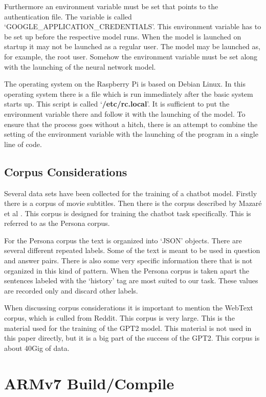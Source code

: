 Furthermore an environment variable must be set that points to the authentication file. The variable is called `GOOGLE\_APPLICATION\_CREDENTIALS'. This environment variable has to be set up before the respective model runs. When the model is launched on startup it may not be launched as a regular user. The model may be launched as, for example, the root user. Somehow the environment variable must be set along with the launching of the neural network model.

The operating system on the Raspberry Pi is based on Debian Linux. In this operating system there is a file which is run immediately after the basic system starts up. This script is called `\textbf{/etc/rc.local}'. It is sufficient to put the environment variable there and follow it with the launching of the model. To ensure that the process goes without a hitch, there is an attempt to combine the setting of the environment variable with the launching of the program in a single line of code.


\subsection{Corpus Considerations}

Several data sets have been collected for the training of a chatbot model. Firstly there is a corpus of movie subtitles. Then there is the corpus described by Mazar{\'{e}} et al \cite{DBLP:journals/corr/abs-1809-01984}. This corpus is designed for training the chatbot task specifically. This is referred to as the Persona corpus.

For the Persona corpus the text is organized into `JSON' objects. There are several different repeated labels. Some of the text is meant to be used in question and answer pairs. There is also some very specific information there that is not organized in this kind of pattern. When the Persona corpus is taken apart the sentences labeled with the `history' tag are most suited to our task. These values are recorded only and discard other labels.

When discussing corpus considerations it is important to mention the WebText corpus, which is culled from Reddit. This corpus is very large. This is the material used for the training of the GPT2 model. This material is not used in this paper directly, but it is a big part of the success of the GPT2. This corpus is about 40Gig of data.


\section{ARMv7 Build/Compile}


